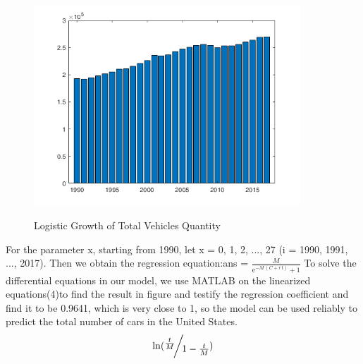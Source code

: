 \documentclass{mcmthesis}
\begin{document}
		\begin{figure}[htbp]
	\centering
	\includegraphics[width=10cm]{img/logistic.png}\\
	\caption{Logistic Growth  of Total Vehicles  Quantity}
	\label{Figure5}
\end{figure}
		\par
For the parameter x, starting from 1990, let x = 0, 1, 2, ..., 27 (i = 1990, 1991, ..., 2017). Then we obtain the regression equation:ans = $\frac{M}{{\mathrm{e}}^{-M\,\left(C+r\,t\right)}+1}$
To solve the differential equations in our model, we use MATLAB on the linearized equations(4)to find the result in figure and testify the regression coefficient and find it to be 0.9641, which is very close to 1, so the model can be used reliably to predict the total number of cars in the United States.
\begin{equation}
\ln ({\raise0.7ex\hbox{${{t \over M}}$} \!\mathord{\left/
		{\vphantom {{{t \over M}} {1 - {t \over M}}}}\right.\kern-\nulldelimiterspace}
	\!\lower0.7ex\hbox{${1 - {t \over M}}$}})
\end{equation}
\end{document}
